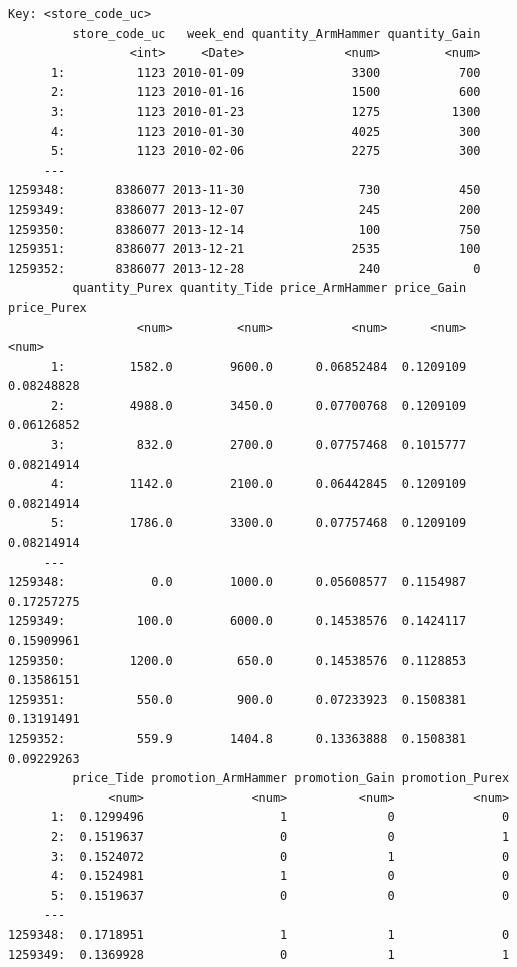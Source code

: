 \documentclass[
]{article}
\begin{document}
\begin{verbatim}
Key: <store_code_uc>
         store_code_uc   week_end quantity_ArmHammer quantity_Gain
                 <int>     <Date>              <num>         <num>
      1:          1123 2010-01-09               3300           700
      2:          1123 2010-01-16               1500           600
      3:          1123 2010-01-23               1275          1300
      4:          1123 2010-01-30               4025           300
      5:          1123 2010-02-06               2275           300
     ---                                                          
1259348:       8386077 2013-11-30                730           450
1259349:       8386077 2013-12-07                245           200
1259350:       8386077 2013-12-14                100           750
1259351:       8386077 2013-12-21               2535           100
1259352:       8386077 2013-12-28                240             0
         quantity_Purex quantity_Tide price_ArmHammer price_Gain price_Purex
                  <num>         <num>           <num>      <num>       <num>
      1:         1582.0        9600.0      0.06852484  0.1209109  0.08248828
      2:         4988.0        3450.0      0.07700768  0.1209109  0.06126852
      3:          832.0        2700.0      0.07757468  0.1015777  0.08214914
      4:         1142.0        2100.0      0.06442845  0.1209109  0.08214914
      5:         1786.0        3300.0      0.07757468  0.1209109  0.08214914
     ---                                                                    
1259348:            0.0        1000.0      0.05608577  0.1154987  0.17257275
1259349:          100.0        6000.0      0.14538576  0.1424117  0.15909961
1259350:         1200.0         650.0      0.14538576  0.1128853  0.13586151
1259351:          550.0         900.0      0.07233923  0.1508381  0.13191491
1259352:          559.9        1404.8      0.13363888  0.1508381  0.09229263
         price_Tide promotion_ArmHammer promotion_Gain promotion_Purex
              <num>               <num>          <num>           <num>
      1:  0.1299496                   1              0               0
      2:  0.1519637                   0              0               1
      3:  0.1524072                   0              1               0
      4:  0.1524981                   1              0               0
      5:  0.1519637                   0              0               0
     ---                                                              
1259348:  0.1718951                   1              1               0
1259349:  0.1369928                   0              1               1

\end{verbatim}
\end{document}

